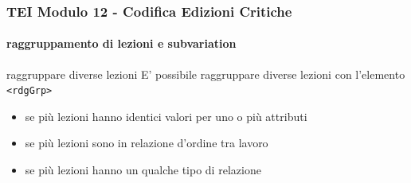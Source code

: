 











\begin{frame}
    \frametitle{TEI Modulo 12 - Codifica Edizioni Critiche}
    \framesubtitle{raggruppamento di lezioni e subvariation}
    \addtocounter{nframe}{1}




    \begin{block}{raggruppare diverse lezioni}
        E' possibile raggruppare diverse lezioni con l'elemento \texttt{<rdgGrp>}
    \end{block}

    \begin{itemize}
        \item se più lezioni hanno identici valori per uno o più attributi
        \item se più lezioni sono in relazione d'ordine tra lavoro
        \item se più lezioni hanno un qualche tipo di relazione
    \end{itemize}

\end{frame}


